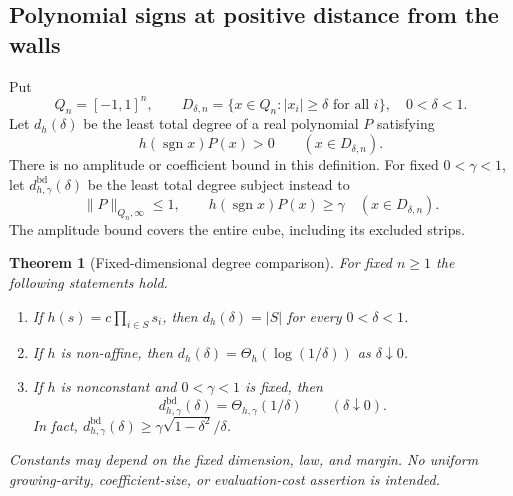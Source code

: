\documentclass[11pt]{article}
\newtheorem{theorem}{Theorem}[section]
\theoremstyle{definition}
\theoremstyle{remark}
\newcommand{\sign}{\operatorname{sgn}}
\begin{document}
\subsection{Polynomial signs at positive distance from the walls}

Put
\[
 Q_n=[-1,1]^n,\qquad
 D_{\delta,n}=\{x\in Q_n:|x_i|\ge\delta\text{ for all }i\},\quad 0<\delta<1.
\]
Let $d_h(\delta)$ be the least total degree of a real polynomial $P$ satisfying
\[
 h(\sign x)P(x)>0\qquad(x\in D_{\delta,n}).
\]
There is no amplitude or coefficient bound in this definition. For fixed $0<\gamma<1$, let $d^{\mathrm{bd}}_{h,\gamma}(\delta)$ be the least total degree subject instead to
\begin{equation}\label{eq:boundedmargin}
 \|P\|_{Q_n,\infty}\le1,\qquad
 h(\sign x)P(x)\ge\gamma\quad(x\in D_{\delta,n}).
\end{equation}
The amplitude bound covers the entire cube, including its excluded strips.

\begin{theorem}[Fixed-dimensional degree comparison]\label{thm:guardeddegree}
For fixed $n\ge1$ the following statements hold.
\begin{enumerate}[label=(\roman*)]
\item If $h(s)=c\prod_{i\in S}s_i$, then $d_h(\delta)=|S|$ for every $0<\delta<1$.
\item If $h$ is non-affine, then $d_h(\delta)=\Theta_h(\log(1/\delta))$ as $\delta\downarrow0$.
\item If $h$ is nonconstant and $0<\gamma<1$ is fixed, then
\[
 d^{\mathrm{bd}}_{h,\gamma}(\delta)=\Theta_{h,\gamma}(1/\delta)
 \qquad(\delta\downarrow0).
\]
In fact, $d^{\mathrm{bd}}_{h,\gamma}(\delta)\ge\gamma\sqrt{1-\delta^2}/\delta$.
\end{enumerate}
Constants may depend on the fixed dimension, law, and margin. No uniform growing-arity, coefficient-size, or evaluation-cost assertion is intended.
\end{theorem}
\end{document}

